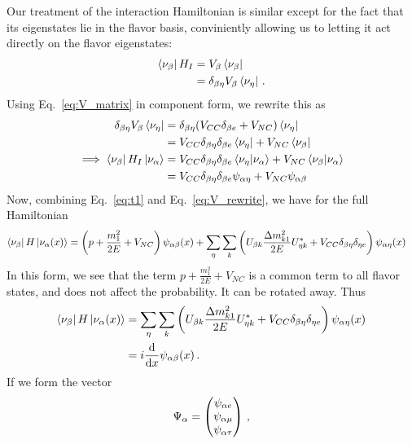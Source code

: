 Our treatment of the interaction Hamiltonian is similar except for the fact that its eigenstates lie in the flavor basis, conviniently allowing us
to letting it act directly on the flavor eigenstates:
\begin{align}
    \bra{\nu_\beta}H_I &= V_\beta \bra{\nu_\beta} \nonumber \\
                    &= \delta_{\beta\eta} V_\beta \bra{\nu_\eta}\,.
\end{align}
Using Eq.~\ref{eq:V_matrix} in component form, we rewrite this as
\begin{align}\label{eq:V_rewrite}
    \delta_{\beta\eta} V_\beta \bra{\nu_\eta} &= \delta_{\beta\eta} (V_{CC}\delta_{\beta e} + V_{NC}) \bra{\nu_\eta} \nonumber \\
                                           &= V_{CC}\delta_{\beta\eta}\delta_{\beta e} \bra{\nu_\eta} + V_{NC}\bra{\nu_\beta} \nonumber \\
    \implies \bra{\nu_\beta}H_I\ket{\nu_\alpha}   &= V_{CC}\delta_{\beta\eta}\delta_{\beta e} \bra{\nu_\eta}\ket{\nu_\alpha} + V_{NC}\bra{\nu_\beta}\ket{\nu_\alpha} \nonumber \\
                                           &= V_{CC}\delta_{\beta\eta}\delta_{\beta e} \psi_{\alpha\eta} + V_{NC}\psi_{\alpha\beta}
\end{align}
Now, combining Eq.~\ref{eq:t1} and Eq.~\ref{eq:V_rewrite}, we have for the full Hamiltonian
\begin{align}
    \bra{\nu_\b}H\ket{\nu_\a (x)} &= \left(p + \frac{m^2_1}{2E} + V_{NC}\right) \psi_{\a\b}(x) + \sum_\eta\sum_k \left(U_{\b k} \frac{\dm_{k1}}{2E} U^*_{\eta k} + V_{CC}\delta_{\b\eta}\delta_{\eta e} \right) \psi_{\a\eta}(x)
\end{align}
In this form, we see that the term $p + \frac{m^2_1}{2E} + V_{NC}$  is a common term to all flavor states, and does not affect the probability. It can be rotated away.
Thus
\begin{align}\label{eq:components}
    \bra{\nu_\b}H\ket{\nu_\a (x)} &= \sum_\eta\sum_k \left(U_{\b k} \frac{\dm_{k1}}{2E} U^*_{\eta k} + V_{CC}\delta_{\b\eta}\delta_{\eta e}\right) \psi_{\a\eta}(x) \nonumber \\
                                  &= i \dv{}{x}\psi_{\a\b}(x)\,.
\end{align}
If we form the vector 
\begin{align}
    \Psi_\alpha = \begin{pmatrix}
        \psi_{\alpha e} \\
        \psi_{\alpha \mu} \\
        \psi_{\alpha \tau}
    \end{pmatrix}\,,
\end{align}
